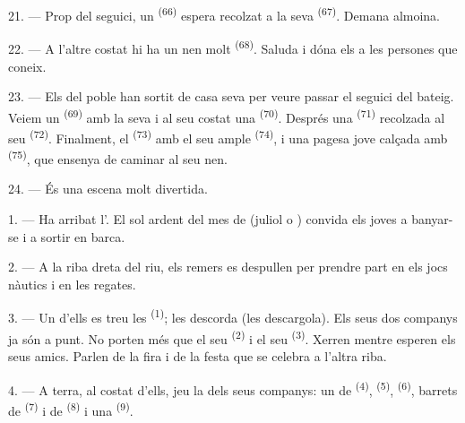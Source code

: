 \VUsaut{4.6mm}
\VUsaut{3.4mm}

21. --- Prop del seguici, un  \textsuperscript{(66)} espera recolzat a la
seva  \textsuperscript{(67)}. Demana almoina.

22. --- A l'altre costat hi ha un nen molt  \textsuperscript{(68)}. Saluda i
dóna els  a les persones que coneix.

23. --- Els del poble han sortit de casa seva per veure passar el seguici del bateig. Veiem un
 \textsuperscript{(69)} amb la seva  i al seu costat una
 \textsuperscript{(70)}. Després una
 \textsuperscript{(71)} recolzada al seu 
\textsuperscript{(72)}. Finalment, el  \textsuperscript{(73)} amb el seu ample
 \textsuperscript{(74)}, i una pagesa jove calçada amb
 \textsuperscript{(75)}, que ensenya de caminar al seu nen.

24. --- És una escena molt divertida.
\VUsaut{4.0mm}

\VUsaut{3.0mm}

\VUsaut{2.4mm}

\VUsaut{3.0mm}

1. --- Ha arribat l'. El sol ardent del mes de  (juliol o
) convida els joves a banyar-se i a sortir en barca.

2. --- A la riba dreta del riu, els remers es despullen per prendre part en els jocs nàutics i
en les regates.

3. --- Un d'ells es treu les  \textsuperscript{(1)}; les descorda (les
descargola). Els seus dos companys ja són a punt. No porten més que el seu
 \textsuperscript{(2)} i el seu 
\textsuperscript{(3)}. Xerren mentre esperen els seus amics. Parlen de la fira i de la festa
que se celebra a l'altra riba.

4. --- A terra, al costat d'ells, jeu la  dels seus companys: un
 de  \textsuperscript{(4)}, 
\textsuperscript{(5)},  \textsuperscript{(6)}, barrets de
 \textsuperscript{(7)} i de  \textsuperscript{(8)} i
una  \textsuperscript{(9)}.

